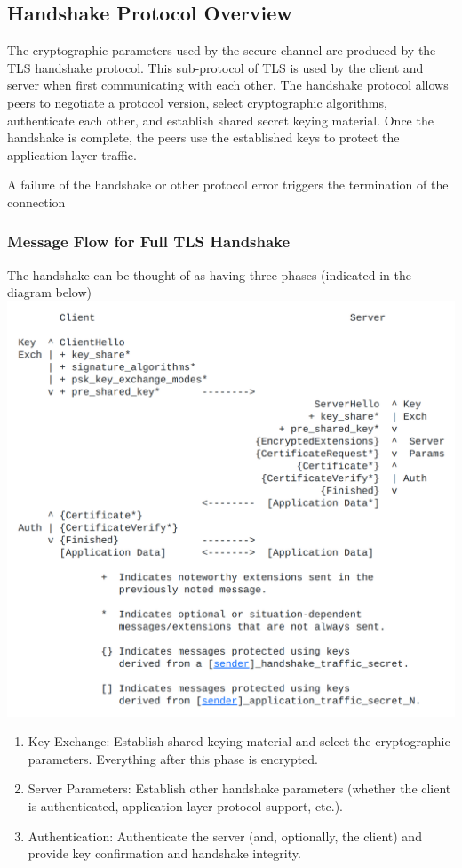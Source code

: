\documentclass{article}
\begin{document}
\subsection{Handshake Protocol Overview}
The cryptographic parameters used by the secure channel are produced
by the TLS handshake protocol.  This sub-protocol of TLS is used by
the client and server when first communicating with each other.  The
handshake protocol allows peers to negotiate a protocol version,
select cryptographic algorithms, authenticate each other,
and establish shared secret keying material.  Once the handshake is
complete, the peers use the established keys to protect the
application-layer traffic.

A failure of the handshake or other protocol error triggers the
termination of the connection

\subsubsection{Message Flow for Full TLS Handshake}
\begin{center}
    The handshake can be thought of as having three phases (indicated in
    the diagram below)
    \includegraphics[width=1.1\columnwidth]{media/overview.png}
\end{center}


\begin{enumerate}
    \item Key Exchange: Establish shared keying material and select the
          cryptographic parameters.  Everything after this phase is
          encrypted.
    \item Server Parameters: Establish other handshake parameters
          (whether the client is authenticated, application-layer protocol
          support, etc.).
    \item Authentication: Authenticate the server (and, optionally, the
          client) and provide key confirmation and handshake integrity.
\end{enumerate}
\end{document}
